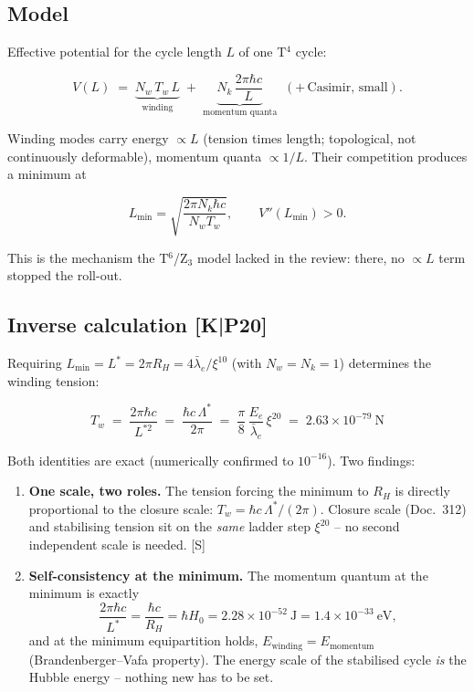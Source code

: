 \subsection{Model}

Effective potential for the cycle length $L$ of one T$^4$ cycle:

\begin{equation}
  V(L) \;=\; \underbrace{N_w\,T_w\,L}_{\text{winding}}
  \;+\; \underbrace{N_k\,\frac{2\pi\hbar c}{L}}_{\text{momentum quanta}}
  \;\;(+\,\text{Casimir, small}).
  \label{eq:pot}
\end{equation}

Winding modes carry energy $\propto L$ (tension times length;
topological, not continuously deformable), momentum quanta
$\propto 1/L$. Their competition produces a minimum at

\begin{equation}
  L_{\min} = \sqrt{\frac{2\pi N_k \hbar c}{N_w T_w}},
  \qquad V''(L_{\min}) > 0.
\end{equation}

This is the mechanism the T$^6$/Z$_3$ model lacked in the review:
there, no $\propto L$ term stopped the roll-out.

\subsection{Inverse calculation [K|P20]}

Requiring $L_{\min} = L^{*} = 2\pi R_H = 4\bar\lambda_e/\xi^{10}$
(with $N_w = N_k = 1$) determines the winding tension:

\begin{equation}
  \boxed{\;T_w \;=\; \frac{2\pi\hbar c}{L^{*2}}
  \;=\; \frac{\hbar c\,\Lambda^{*}}{2\pi}
  \;=\; \frac{\pi}{8}\,\frac{E_e}{\bar\lambda_e}\,\xi^{20}
  \;=\; 2.63\times10^{-79}~\text{N}\;}
  \label{eq:tw}
\end{equation}

Both identities are exact (numerically confirmed to $10^{-16}$).
Two findings:

\begin{enumerate}
  \item \textbf{One scale, two roles.} The tension forcing the
        minimum to $R_H$ is directly proportional to the closure
        scale: $T_w = \hbar c\,\Lambda^{*}/(2\pi)$. Closure scale
        (Doc.~312) and stabilising tension sit on the \emph{same}
        ladder step $\xi^{20}$ -- no second independent scale is
        needed. [S]
  \item \textbf{Self-consistency at the minimum.} The momentum
        quantum at the minimum is exactly
        \[
          \frac{2\pi\hbar c}{L^{*}} = \frac{\hbar c}{R_H}
          = \hbar H_0 = 2.28\times10^{-52}~\text{J}
          = 1.4\times10^{-33}~\text{eV},
        \]
        and at the minimum equipartition holds,
        $E_\text{winding} = E_\text{momentum}$ (Brandenberger--Vafa
        property). The energy scale of the stabilised cycle
        \emph{is} the Hubble energy -- nothing new has to be set.
\end{enumerate}

